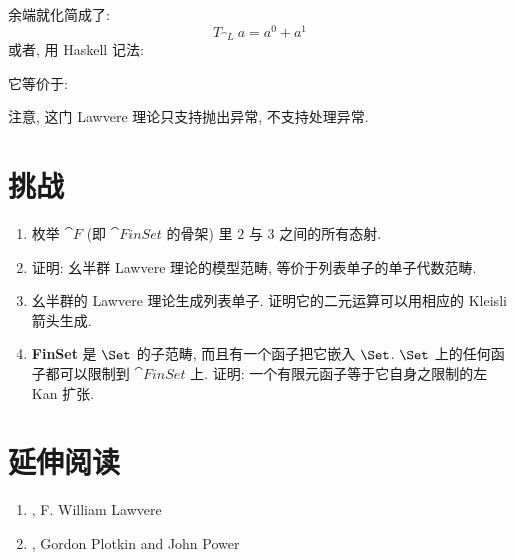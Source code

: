 \noindent
余端就化简成了: \[T_{\cat{L}}\ a = a^0 + a^1\] 或者, 用 Haskell 记法:

 它等价于:

 注意, 这门 Lawvere 理论只支持抛出异常, 不支持处理异常.

\section{挑战}

\begin{enumerate}
  \tightlist
  \item
枚举 $\cat{F}$ (即 $\cat{FinSet}$ 的骨架) 里 $2$ 与 $3$ 之间的所有态射.
  \item
证明: 幺半群 Lawvere 理论的模型范畴, 等价于列表单子的单子代数范畴.
  \item
幺半群的 Lawvere 理论生成列表单子. 证明它的二元运算可以用相应的 Kleisli 箭头生成.
  \item
\textbf{FinSet} 是 $\Set$ 的子范畴, 而且有一个函子把它嵌入 $\Set$. $\Set$ 上的任何函子都可以限制到
$\cat{FinSet}$ 上. 证明: 一个有限元函子等于它自身之限制的左 Kan 扩张.
\end{enumerate}

\section{延伸阅读}
\begin{enumerate}
  \tightlist
  \item
{},
F. William Lawvere
  \item
{},
Gordon Plotkin and John Power
\end{enumerate}
